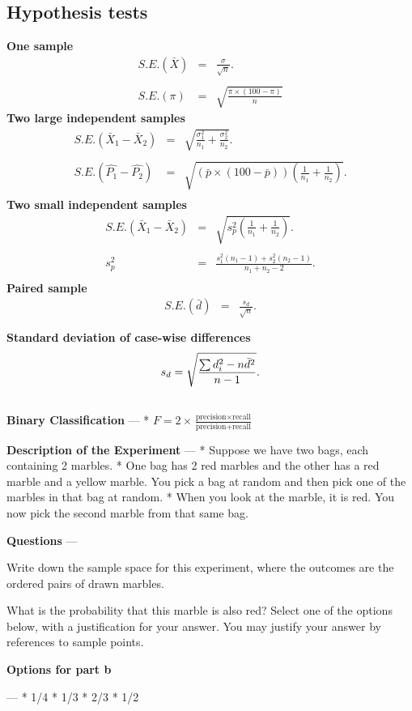 \subsection*{Hypothesis tests}
{\bf One sample}
\begin{eqnarray*}
S.E.(\bar{X})&=&\frac{\sigma}{\sqrt{n}}.\\\\
S.E.(\pi)&=&\sqrt{\frac{\pi\times(100-\pi)}{n}}
\end{eqnarray*}
{\bf Two large independent samples}
\begin{eqnarray*}
S.E.(\bar{X}_1-\bar{X}_2)&=&\sqrt{\frac{\sigma^2_1}{n_1}+\frac{\sigma_2^2}{n_2}}.\\\\
S.E.(\hat{P_1}-\hat{P_2})&=&\sqrt{\left(\bar{p}\times(100-\bar{p})\right)\left(\frac{1}{n_1}+\frac{1}{n_2}\right)}.\\
\end{eqnarray*}
{\bf Two small independent samples}
\begin{eqnarray*}
S.E.(\bar{X}_1-\bar{X}_2)&=&\sqrt{s_p^2\left(\frac{1}{n_1}+\frac{1}{n_2}\right)}.\\\\
s_p^2&=&\frac{s_1^2(n_1-1)+s_2^2(n_2-1)}{n_1+n_2-2}.\\
\end{eqnarray*}
{\bf Paired sample}
\begin{eqnarray*}
S.E.(\bar{d})&=&\frac{s_d}{\sqrt{n}}.\\\\
\end{eqnarray*}
{\bf Standard deviation of case-wise differences}
\begin{eqnarray*}
s_d = \sqrt{ {\sum d_i^2 - n\bar{d}^2 \over n-1}}.\\\\
\end{eqnarray*}
{\bf Binary Classification}
--- 
* $F = 2 \times \frac{\mbox{precision} \times \mbox{recall}}{ \mbox{precision} + \mbox{recall}}$






\textbf{Description of the Experiment}
--- 
* Suppose we have two bags, each containing 2 marbles. 
* One bag has 2 red marbles and
the other has a red marble and a yellow marble. 
You pick a bag at random and then pick
one of the marbles in that bag at random. 
* When you look at the marble, it is red. 
You
now pick the second marble from that same bag.
 
\textbf{Questions}
--- 
\item[(a)]  Write down the sample space for this experiment, where the outcomes are the ordered pairs of drawn marbles.
\item[(b)] What is the probability that this marble
is also red? Select one of the options below, with a justification for your answer.
You may justify your answer by references to sample points.

\textbf{Options for part b}
\begin{center}
\begin{multicols}{4}
--- 
* 1/4
* 1/3
* 2/3
*  1/2

\end{multicols}
\end{center}
